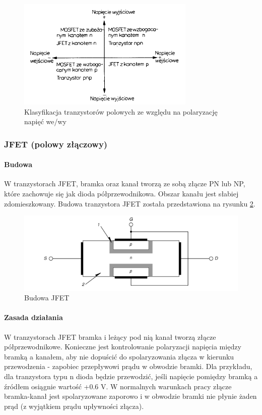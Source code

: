 \documentclass[a4paper,twoside]{report}
\begin{document}
\begin{figure}[htbp]
\centering
\includegraphics[scale=0.9]{obrazy/tranzystory/tranuniuklad.png}
\caption{Klasyfikacja tranzystorów polowych ze względu na polaryzację napięć we/wy}
\label{rys:tranUni_klas_we/wy}
\end{figure}


\subsubsection{JFET (polowy złączowy)}
\paragraph{Budowa\\}
W tranzystorach JFET, bramka oraz kanał tworzą ze sobą złącze PN lub NP, które zachowuje się jak dioda półprzewodnikowa. Obszar kanału jest słabiej zdomieszkowany.
Budowa tranzystora JFET została przedstawiona na rysunku \ref{rys:budowa_jfet}. 
\begin{figure}[htbp]
\centering
\includegraphics[scale=0.7]{obrazy/tranzystory/tranunijfetbudowa.png}
\caption{Budowa JFET}
\label{rys:budowa_jfet}
\end{figure}

\paragraph{Zasada działania\\}
W tranzystorach JFET bramka i leżący pod nią kanał tworzą złącze półprzewodnikowe. Konieczne jest kontrolowanie polaryzacji napięcia między bramką a kanałem, aby nie dopuścić do spolaryzowania złącza w kierunku przewodzenia - zapobiec przepływowi prądu w obwodzie bramki. Dla przykładu, dla tranzystora typu n dioda będzie przewodzić, jeśli napięcie pomiędzy bramką a źródłem osiągnie wartość +0.6 V. W normalnych warunkach pracy złącze bramka-kanał jest spolaryzowane zaporowo i w obwodzie bramki nie płynie żaden prąd (z wyjątkiem prądu upływności złącza).
\end{document}
